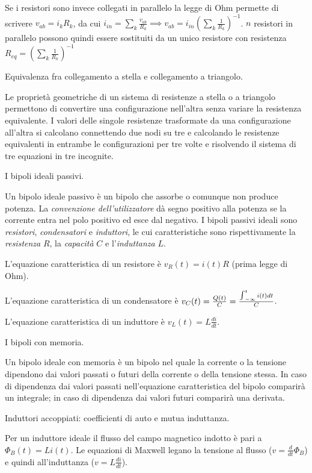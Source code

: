 \documentclass[answers, a4paper,12pt]{exam}
\newcommand{\bigint}{\mathop{\mathlarger{\int}}}
\begin{document}
\begin{questions}
\begin{solution}
		Se i resistori sono invece collegati in parallelo la legge di Ohm permette di scrivere $v_{ab} = i_k R_k$, da cui $i_{in} = \sum_k \frac{v_{ab}}{R_k} \implies v_{ab} = i_{in} (\sum_k \frac{1}{R_k})^{-1}$. $n$ resistori in parallelo possono quindi essere sostituiti da un unico resistore con resistenza $R_{eq} = (\sum_k \frac{1}{R_k})^{-1}$
		\end{solution}
		\pagebreak
	\question
	Equivalenza fra collegamento a stella e collegamento a triangolo.
	\begin{solution} Le proprietà geometriche di un sistema di resistenze a stella o a triangolo permettono di convertire una configurazione nell'altra senza variare la resistenza equivalente. I valori delle singole resistenze trasformate da una configurazione all'altra si calcolano connettendo due nodi su tre e calcolando le resistenze equivalenti in entrambe le configurazioni per tre volte e risolvendo il sistema di tre equazioni in tre incognite. \end{solution}
	\question
	I bipoli ideali passivi.
	\begin{solution}
		Un bipolo ideale passivo è un bipolo che assorbe o comunque non produce potenza. La \textit{convenzione dell'utilizzatore} dà segno positivo alla potenza se la corrente entra nel polo positivo ed esce dal negativo. I bipoli passivi ideali sono \textit{resistori}, \textit{condensatori} e \textit{induttori}, le cui caratteristiche sono rispettivamente la \textit{resistenza} $R$, la \textit{capacità} $C$ e l'\textit{induttanza} $L$.
		
		L'equazione caratteristica di un resistore è $v_R (t) = i(t) R$ (prima legge di Ohm).
		
		L'equazione caratteristica di un condensatore è $v_C (t) = \frac{Q(t)}{C} = \frac{\bigint_{-\infty}^t i(t) dt}{C}$.
		
		L'equazione caratteristica di un induttore è $v_L (t) = L \frac{di}{dt}$.
	\end{solution}
	\question
	I bipoli con memoria.
	\begin{solution}
		Un bipolo ideale con memoria è un bipolo nel quale la corrente o la tensione dipendono dai valori passati o futuri della corrente o della tensione stessa. In caso di dipendenza dai valori passati nell'equazione caratteristica del bipolo comparirà un integrale; in caso di dipendenza dai valori futuri comparirà una derivata.
	\end{solution}	
	\question
	Induttori accoppiati: coefficienti di auto e mutua induttanza.
	\begin{solution}
		Per un induttore ideale il flusso del campo magnetico indotto è pari a $\Phi_B (t) = L i (t)$. Le equazioni di Maxwell legano la tensione al flusso ($v = \frac{d}{dt}\Phi_B$) e quindi all'induttanza ($v = L \frac{di}{dt}$). 
		

\end{solution}
\end{questions}
\end{document}
